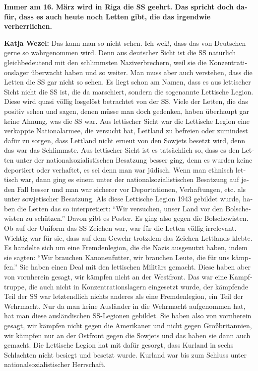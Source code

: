 \begin{otherlanguage}{ngerman}
\textbf{Immer am 16. März wird in Riga die SS geehrt. Das spricht doch dafür, dass es auch heute noch Letten gibt, die das irgendwie verherrlichen.} 

\textbf{Katja Wezel:} Das kann man so nicht sehen. Ich weiß, dass das von Deutschen gerne so wahrgenommen wird. Denn aus deutscher Sicht ist die SS natürlich gleichbedeutend mit den schlimmsten Naziverbrechern, weil sie die Konzentrationslager überwacht haben und so weiter. Man muss aber auch verstehen, dass die Letten die SS gar nicht so sehen. Es liegt schon am Namen, dass es aus lettischer Sicht nicht die SS ist, die da marschiert, sondern die sogenannte Lettische Legion. Diese wird quasi völlig losgelöst betrachtet von der SS. Viele der Letten, die das positiv sehen und sagen, denen müsse man doch gedenken, haben überhaupt gar keine Ahnung, was die SS war. Aus lettischer Sicht war die Lettische Legion eine verkappte Nationalarmee, die versucht hat, Lettland zu befreien oder zumindest dafür zu sorgen, dass Lettland nicht erneut von den Sowjets besetzt wird, denn das war das Schlimmste. Aus lettischer Sicht ist es tatsächlich so, dass es den Letten unter der nationalsozialistischen Besatzung besser ging, denn es wurden keine deportiert oder verhaftet, es sei denn man war jüdisch. Wenn man ethnisch lettisch war, dann ging es einem unter der nationalsozialistischen Besatzung auf jeden Fall besser und man war sicherer vor Deportationen, Verhaftungen, etc. als unter sowjetischer Besatzung. Als diese Lettische Legion 1943 gebildet wurde, haben die Letten das so interpretiert: ``Wir versuchen, unser Land vor den Bolschewisten zu schützen.'' Davon gibt es Poster. Es ging also gegen die Bolschewisten. Ob auf der Uniform das SS-Zeichen war, war für die Letten völlig irrelevant. Wichtig war für sie, dass auf dem Gewehr trotzdem das Zeichen Lettlands klebte. Es handelte sich um eine Fremdenlegion, die die Nazis ausgenutzt haben, indem sie sagten: ``Wir brauchen Kanonenfutter, wir brauchen Leute, die für uns kämpfen.'' Sie haben einen Deal mit den lettischen Militärs gemacht. Diese haben aber von vornherein gesagt, wir kämpfen nicht an der Westfront. Das war eine Kampftruppe, die auch nicht in Konzentrationslagern eingesetzt wurde, der kämpfende Teil der SS war letztendlich nichts anderes als eine Fremdenlegion, ein Teil der Wehrmacht. Nur da man keine Ausländer in die Wehrmacht aufgenommen hat, hat man diese ausländischen SS-Legionen gebildet. Sie haben also von vornherein gesagt, wir kämpfen nicht gegen die Amerikaner und nicht gegen Großbritannien, wir kämpfen nur an der Ostfront gegen die Sowjets und das haben sie dann auch gemacht. Die Lettische Legion hat mit dafür gesorgt, dass Kurland in sechs Schlachten nicht besiegt und besetzt wurde. Kurland war bis zum Schluss unter nationalsozialistischer Herrschaft. 

\end{otherlanguage}
